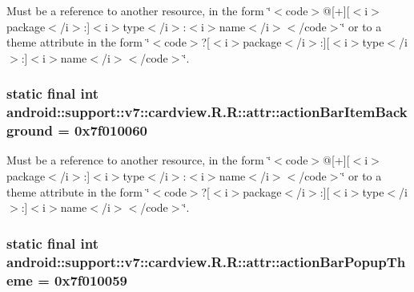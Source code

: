 Must be a reference to another resource, in the form \char`\"{}$<$code$>$@\mbox{[}+\mbox{]}\mbox{[}$<$i$>$package$<$/i$>$:\mbox{]}$<$i$>$type$<$/i$>$:$<$i$>$name$<$/i$>$$<$/code$>$\char`\"{} or to a theme attribute in the form \char`\"{}$<$code$>$?\mbox{[}$<$i$>$package$<$/i$>$:\mbox{]}\mbox{[}$<$i$>$type$<$/i$>$:\mbox{]}$<$i$>$name$<$/i$>$$<$/code$>$\char`\"{}. \hypertarget{classandroid_1_1support_1_1v7_1_1cardview_1_1_r_1_1attr_961aea8befc1a8ae32a215ccd795acb8}{
\subsubsection[{actionBarItemBackground}]{\setlength{\rightskip}{0pt plus 5cm}static final int android::support::v7::cardview.R.R::attr::actionBarItemBackground = 0x7f010060}}
\label{classandroid_1_1support_1_1v7_1_1cardview_1_1_r_1_1attr_961aea8befc1a8ae32a215ccd795acb8}


Must be a reference to another resource, in the form \char`\"{}$<$code$>$@\mbox{[}+\mbox{]}\mbox{[}$<$i$>$package$<$/i$>$:\mbox{]}$<$i$>$type$<$/i$>$:$<$i$>$name$<$/i$>$$<$/code$>$\char`\"{} or to a theme attribute in the form \char`\"{}$<$code$>$?\mbox{[}$<$i$>$package$<$/i$>$:\mbox{]}\mbox{[}$<$i$>$type$<$/i$>$:\mbox{]}$<$i$>$name$<$/i$>$$<$/code$>$\char`\"{}. \hypertarget{classandroid_1_1support_1_1v7_1_1cardview_1_1_r_1_1attr_c8ea8c492c16557c6d7f0dc0aaf4c445}{
\subsubsection[{actionBarPopupTheme}]{\setlength{\rightskip}{0pt plus 5cm}static final int android::support::v7::cardview.R.R::attr::actionBarPopupTheme = 0x7f010059}}
\label{classandroid_1_1support_1_1v7_1_1cardview_1_1_r_1_1attr_c8ea8c492c16557c6d7f0dc0aaf4c445}


